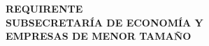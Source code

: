 \documentclass[12pt, oneside]{article} %
\begin{document}
\begin{titlepage}
\noindent
\begin{minipage}{\textwidth}
 \vspace*{5mm} 
 \begin{flushright}
 \fontsize{8.5pt}{8pt}\selectfont
 \textbf{REQUIRENTE} \\ \textbf{SUBSECRETARÍA DE ECONOMÍA Y } \\  \textbf{EMPRESAS DE MENOR TAMAÑO} \\ 

\end{flushright}
\end{minipage}
\end{titlepage}
\end{document}

